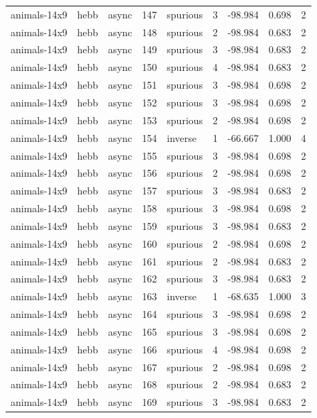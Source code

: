 \begin{tabular}{lllrlrrrr}
animals-14x9 & hebb & async & 147 & spurious & 3 & -98.984 & 0.698 & 2 \\
animals-14x9 & hebb & async & 148 & spurious & 2 & -98.984 & 0.683 & 2 \\
animals-14x9 & hebb & async & 149 & spurious & 3 & -98.984 & 0.683 & 2 \\
animals-14x9 & hebb & async & 150 & spurious & 4 & -98.984 & 0.683 & 2 \\
animals-14x9 & hebb & async & 151 & spurious & 3 & -98.984 & 0.698 & 2 \\
animals-14x9 & hebb & async & 152 & spurious & 3 & -98.984 & 0.698 & 2 \\
animals-14x9 & hebb & async & 153 & spurious & 2 & -98.984 & 0.698 & 2 \\
animals-14x9 & hebb & async & 154 & inverse & 1 & -66.667 & 1.000 & 4 \\
animals-14x9 & hebb & async & 155 & spurious & 3 & -98.984 & 0.698 & 2 \\
animals-14x9 & hebb & async & 156 & spurious & 2 & -98.984 & 0.698 & 2 \\
animals-14x9 & hebb & async & 157 & spurious & 3 & -98.984 & 0.683 & 2 \\
animals-14x9 & hebb & async & 158 & spurious & 3 & -98.984 & 0.698 & 2 \\
animals-14x9 & hebb & async & 159 & spurious & 3 & -98.984 & 0.683 & 2 \\
animals-14x9 & hebb & async & 160 & spurious & 2 & -98.984 & 0.698 & 2 \\
animals-14x9 & hebb & async & 161 & spurious & 2 & -98.984 & 0.683 & 2 \\
animals-14x9 & hebb & async & 162 & spurious & 3 & -98.984 & 0.683 & 2 \\
animals-14x9 & hebb & async & 163 & inverse & 1 & -68.635 & 1.000 & 3 \\
animals-14x9 & hebb & async & 164 & spurious & 3 & -98.984 & 0.698 & 2 \\
animals-14x9 & hebb & async & 165 & spurious & 3 & -98.984 & 0.698 & 2 \\
animals-14x9 & hebb & async & 166 & spurious & 4 & -98.984 & 0.698 & 2 \\
animals-14x9 & hebb & async & 167 & spurious & 2 & -98.984 & 0.698 & 2 \\
animals-14x9 & hebb & async & 168 & spurious & 2 & -98.984 & 0.683 & 2 \\
animals-14x9 & hebb & async & 169 & spurious & 3 & -98.984 & 0.683 & 2 \\

\end{tabular}
